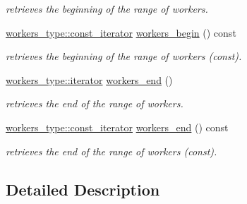\begin{DoxyCompactItemize}
\begin{DoxyCompactList}\small\item\em retrieves the beginning of the range of workers. \end{DoxyCompactList}\item 
\hypertarget{classhryky_1_1task_1_1distributor_1_1_impl_a981400fa1d60ebf567b70c7f3bea7651}{\hyperlink{classhryky_1_1iterator_1_1random_1_1_immutable}{workers\-\_\-type\-::const\-\_\-iterator} \hyperlink{classhryky_1_1task_1_1distributor_1_1_impl_a981400fa1d60ebf567b70c7f3bea7651}{workers\-\_\-begin} () const}\label{classhryky_1_1task_1_1distributor_1_1_impl_a981400fa1d60ebf567b70c7f3bea7651}

\begin{DoxyCompactList}\small\item\em retrieves the beginning of the range of workers (const). \end{DoxyCompactList}\item 
\hypertarget{classhryky_1_1task_1_1distributor_1_1_impl_a3b14236e27e27190e7f9f90469d6f3bf}{\hyperlink{classhryky_1_1iterator_1_1random_1_1_mutable}{workers\-\_\-type\-::iterator} \hyperlink{classhryky_1_1task_1_1distributor_1_1_impl_a3b14236e27e27190e7f9f90469d6f3bf}{workers\-\_\-end} ()}\label{classhryky_1_1task_1_1distributor_1_1_impl_a3b14236e27e27190e7f9f90469d6f3bf}

\begin{DoxyCompactList}\small\item\em retrieves the end of the range of workers. \end{DoxyCompactList}\item 
\hypertarget{classhryky_1_1task_1_1distributor_1_1_impl_aba1ffce9125b4c8ac4de7a4551aad8df}{\hyperlink{classhryky_1_1iterator_1_1random_1_1_immutable}{workers\-\_\-type\-::const\-\_\-iterator} \hyperlink{classhryky_1_1task_1_1distributor_1_1_impl_aba1ffce9125b4c8ac4de7a4551aad8df}{workers\-\_\-end} () const}\label{classhryky_1_1task_1_1distributor_1_1_impl_aba1ffce9125b4c8ac4de7a4551aad8df}

\begin{DoxyCompactList}\small\item\em retrieves the end of the range of workers (const). \end{DoxyCompactList}\end{DoxyCompactItemize}


\subsection{Detailed Description}
